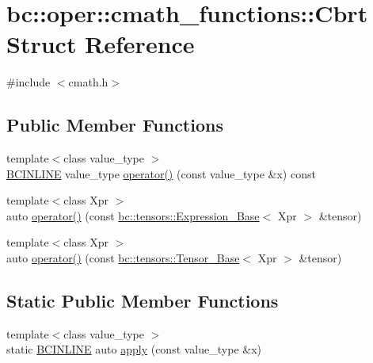 \hypertarget{structbc_1_1oper_1_1cmath__functions_1_1Cbrt}{}\section{bc\+:\+:oper\+:\+:cmath\+\_\+functions\+:\+:Cbrt Struct Reference}
\label{structbc_1_1oper_1_1cmath__functions_1_1Cbrt}


{\ttfamily \#include $<$cmath.\+h$>$}

\subsection*{Public Member Functions}
\begin{DoxyCompactItemize}
\item 
{\footnotesize template$<$class value\+\_\+type $>$ }\\\hyperlink{common_8h_a6699e8b0449da5c0fafb878e59c1d4b1}{B\+C\+I\+N\+L\+I\+NE} value\+\_\+type \hyperlink{structbc_1_1oper_1_1cmath__functions_1_1Cbrt_ac3bc8f628fe41ca465719771da7d1f2d}{operator()} (const value\+\_\+type \&x) const
\item 
{\footnotesize template$<$class Xpr $>$ }\\auto \hyperlink{structbc_1_1oper_1_1cmath__functions_1_1Cbrt_a7c1542de49f36c0c3a53ad2fd790073b}{operator()} (const \hyperlink{classbc_1_1tensors_1_1Expression__Base}{bc\+::tensors\+::\+Expression\+\_\+\+Base}$<$ Xpr $>$ \&tensor)
\item 
{\footnotesize template$<$class Xpr $>$ }\\auto \hyperlink{structbc_1_1oper_1_1cmath__functions_1_1Cbrt_a7ed05c07cf4bb16022e48b3245645b04}{operator()} (const \hyperlink{classbc_1_1tensors_1_1Tensor__Base}{bc\+::tensors\+::\+Tensor\+\_\+\+Base}$<$ Xpr $>$ \&tensor)
\end{DoxyCompactItemize}
\subsection*{Static Public Member Functions}
\begin{DoxyCompactItemize}
\item 
{\footnotesize template$<$class value\+\_\+type $>$ }\\static \hyperlink{common_8h_a6699e8b0449da5c0fafb878e59c1d4b1}{B\+C\+I\+N\+L\+I\+NE} auto \hyperlink{structbc_1_1oper_1_1cmath__functions_1_1Cbrt_a95a73ba5b5e9ab8f90782e7bea728e59}{apply} (const value\+\_\+type \&x)
\end{DoxyCompactItemize}


